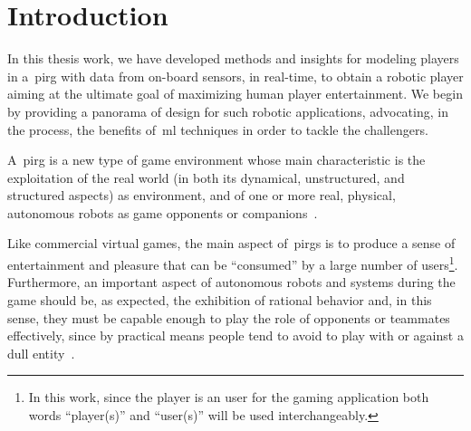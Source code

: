 \chapter{Introduction}

In this thesis work, we have developed methods and insights for modeling players in a~\acrfull{pirg} with data from on-board sensors, in real-time, to obtain a robotic player aiming at the ultimate goal of maximizing human player entertainment. We begin by providing a panorama of design for such robotic applications, advocating, in the process, the benefits of~\gls{ml} techniques in order to tackle the challengers.

A~\gls{pirg} is a new type of game environment whose main characteristic is the exploitation of the real world (in both its dynamical, unstructured, and structured aspects) as environment, and of one or more real, physical, autonomous robots as game opponents or companions~\citep{martinoia_physically_2013}.

Like commercial virtual games, the main aspect of~\gls{pirg}s is to produce a sense of entertainment and pleasure that can be ``consumed'' by a large number of users\footnote{In this work, since the player is an user for the gaming application both words ``player(s)'' and ``user(s)'' will be used interchangeably.}. Furthermore, an important aspect of autonomous robots and systems during the game should be, as expected, the exhibition of rational behavior and, in this sense, they must be capable enough to play the role of opponents or teammates effectively, since by practical means people tend to avoid to play with or against a dull entity~\citep{martinoia_physically_2013}.

